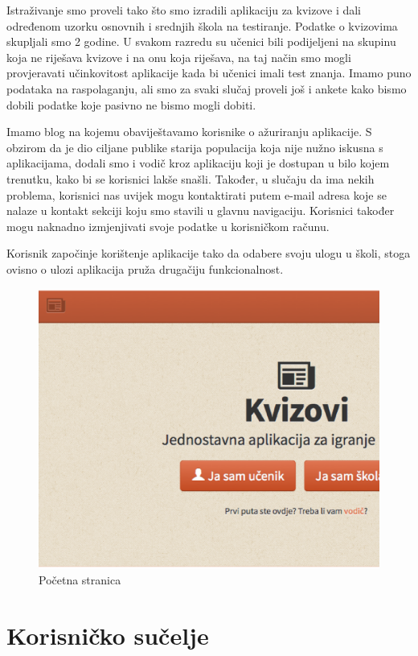 \documentclass{scrreprt}
\begin{document}
Istraživanje smo proveli tako što smo izradili aplikaciju za kvizove i dali
određenom uzorku osnovnih i srednjih škola na testiranje. Podatke o kvizovima
skupljali smo 2 godine. U svakom razredu su učenici bili podijeljeni na skupinu
koja ne riješava kvizove i na onu koja riješava, na taj način smo mogli
provjeravati učinkovitost aplikacije kada bi učenici imali test znanja. Imamo
puno podataka na raspolaganju, ali smo za svaki slučaj proveli još i ankete kako
bismo dobili podatke koje pasivno ne bismo mogli dobiti.

Imamo blog na kojemu obaviještavamo korisnike o ažuriranju aplikacije. S obzirom
da je dio ciljane publike starija populacija koja nije nužno iskusna s
aplikacijama, dodali smo i vodič kroz aplikaciju koji je dostupan u bilo kojem
trenutku, kako bi se korisnici lakše snašli. Također, u slučaju da ima nekih
problema, korisnici nas uvijek mogu kontaktirati putem e-mail adresa koje se
nalaze u kontakt sekciji koju smo stavili u glavnu navigaciju. Korisnici također
mogu naknadno izmjenjivati svoje podatke u korisničkom računu.

Korisnik započinje korištenje aplikacije tako da odabere svoju ulogu u školi,
stoga ovisno o ulozi aplikacija pruža drugačiju funkcionalnost.

\begin{figure}[H]
  \includegraphics[width=\textwidth, clip=true, trim=0 7cm 0 0, fbox]{home}
  \caption{Početna stranica}
\end{figure}

\section{Korisničko sučelje}
\end{document}
